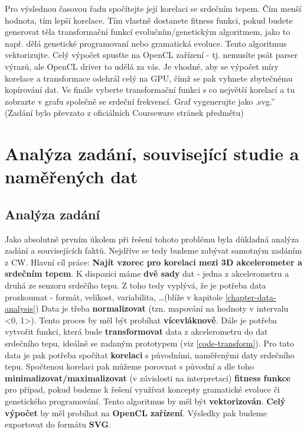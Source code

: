 \documentclass[12pt, a4paper]{article}
\begin{document}
Pro výslednou časovou řadu spočítejte její korelaci se srdečním tepem. 
Čím menší hodnota, tím lepší korelace. 
Tím vlastně dostanete fitness funkci, pokud budete generovat těla transformační funkcí evolučním/genetickým algoritmem, jako to např. dělá genetické programovaní nebo gramatická evoluce. 
Tento algoritmus vektorizujte.
Celý výpočet spusťte na OpenCL zařízení - tj. nemusíte psát parser výrazů, ale OpenCL driver to udělá za vás. 
Je vhodné, aby se výpočet míry korelace a transformace odehrál celý na GPU, čímž se pak vyhnete zbytečnému kopírování dat.
Ve finále vyberte transformační funkci s co největší korelací a tu zobrazte v grafu společně se srdeční frekvencí. 
Graf vygenerujte jako .svg.''
(Zadání bylo převzato z oficiálních Courseware stránek předmětu)

\newpage
\section{Analýza zadání, související studie a naměřených dat}

\subsection{Analýza zadání}
Jako absolutně prvním úkolem při řešení tohoto problému byla důkladná analýza zadání a souvisejících faktů. 
Nejdříve se tedy budeme zabývat samotným zadáním z CW. 
Hlavní cíl práce: \textbf{Najít vzorec pro korelaci mezi 3D akcelerometer a srdečním tepem}.
K dispozici máme \textbf{dvě sady} dat - jedna z akcelerometru a druhá ze senzoru srdečího tepu.
Z toho tedy vyplývá, že je potřeba data prozkoumat - formát, velikost, variabilita, \dots (blíže v kapitole \ref{chapter-data-analysis})
Data je třeba \textbf{normalizovat} (tzn. mapování na hodnoty v intervalu <0, 1>).
Tento proces by měl být probíhat \textbf{vícevláknově}.
Dále je potřeba vytvořit funkci, která bude \textbf{transformovat} data z akcelerometru do dat srdečního tepu, ideálně se zadaným prototypem (viz \ref{code-transform}).
Pro tato data je pak potřeba spočítat \textbf{korelaci} s původními, naměřenými daty srdečního tepu.
Spočtenou korelaci pak můžeme porovnat s původní a dle toho \textbf{minimalizovat/maximalizovat} (v závislosti na interpretaci) \textrightarrow \textbf{fitness funkce} pro případ, pokud budeme k řešení využívat koncepty gramatické evoluce či genetického programování.
Tento algoritmus by měl být \textbf{vektorizován}.
\textbf{Celý výpočet} by měl probíhat na \textbf{OpenCL zařízení}.
Výsledky pak budeme exportovat do formátu \textbf{SVG}.
\end{document}
